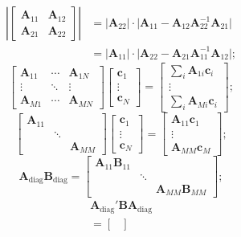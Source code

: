 \documentclass[8pt,letterpaper, landscape]{extarticle} %
\newcommand{\mA}{\ensuremath{\mathbf{A}}}
\newcommand{\mB}{\ensuremath{\mathbf{B}}}
\newcommand{\mc}{\ensuremath{\mathbf{c}}}
\begin{document}
\begin{multicols}{3}
\begin{description}
\begin{align*}
\left \lvert \begin{bmatrix}
\mA_{11} & \mA_{12}  \\
\mA_{21} & \mA_{22}
\end{bmatrix} \right \rvert
&= \lvert \mA_{22} \rvert \cdot  \lvert \mA_{11} - \mA_{12} \mA_{22}^{-1} \mA_{21} \rvert  \\
&= \lvert \mA_{11} \rvert \cdot  \lvert \mA_{22} - \mA_{21} \mA_{11}^{-1} \mA_{12} \rvert ;
\end{align*}
%
$$ \begin{bmatrix}
\mA_{11} & \cdots & \mA_{1N} \\
\vdots & \ddots & \vdots \\
\mA_{M1} & \cdots & \mA_{MN}
\end{bmatrix}
\begin{bmatrix}
\mc_{1}  \\
\vdots  \\
\mc_{N}
\end{bmatrix}
=
\begin{bmatrix}
\sum_i \mA_{1i} \mc_{i}  \\
\vdots  \\
\sum_i \mA_{Mi} \mc_{i}
\end{bmatrix}; $$
%
$$ \begin{bmatrix}
\mA_{11} &  &  \\
 & \ddots &  \\
 &  & \mA_{MM}
\end{bmatrix}
\begin{bmatrix}
\mc_{1}  \\
\vdots  \\
\mc_{N}
\end{bmatrix}
=
\begin{bmatrix}
\mA_{11} \mc_{1}  \\
\vdots  \\
\mA_{MM} \mc_{M}
\end{bmatrix}; $$
%
$$ \mA_\text{diag} \mB_\text{diag} =
\begin{bmatrix}
\mA_{11} \mB_{11} &  &  \\
 & \ddots &  \\
 &  & \mA_{MM} \mB_{MM}
\end{bmatrix};
$$
%
\begin{multline*}
\mA_{\text{diag}}' \mB \mA_{\text{diag}}
\\ =
\begin{bmatrix}

\end{bmatrix}
\end{multline*}
\end{description}
\end{multicols}
\end{document}
